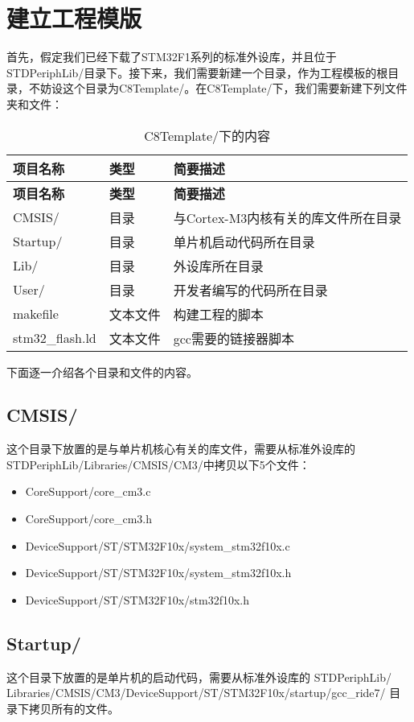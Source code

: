 \section{建立工程模版}
首先，假定我们已经下载了STM32F1系列的标准外设库，并且位于STDPeriphLib/目录下。接下来，我们需要新建一个目录，作为工程模板的根目录，不妨设这个目录为C8Template/。在C8Template/下，我们需要新建下列文件夹和文件：
\begin{center}
	\begin{longtable}[l]{| p{30mm} | p{30mm} | p{80mm} |}
		\caption{C8Template/下的内容}\\
		\hline 
		\rowcolor{Gray}
		\textbf{项目名称} & \textbf{类型} & \textbf{简要描述} \\
		\hline
		\endfirsthead
		
		\hline 
		\rowcolor{Gray}
		\textbf{项目名称} & \textbf{类型} & \textbf{简要描述} \\
		\hline
		\endhead
		
		CMSIS/ &  目录 & 与Cortex-M3内核有关的库文件所在目录 \\ 
		Startup/ & 目录 & 单片机启动代码所在目录 \\
		Lib/ & 目录 & 外设库所在目录 \\
		User/ & 目录 & 开发者编写的代码所在目录 \\
		makefile & 文本文件 & 构建工程的脚本 \\
		stm32\_flash.ld & 文本文件 & gcc需要的链接器脚本 \\
		\hline
	\end{longtable}
\end{center}
\par 
下面逐一介绍各个目录和文件的内容。
\subsection{CMSIS/}
这个目录下放置的是与单片机核心有关的库文件，需要从标准外设库的\\STDPeriphLib/Libraries/CMSIS/CM3/中拷贝以下5个文件：
\begin{itemize}
	\item CoreSupport/core\_cm3.c
	\item CoreSupport/core\_cm3.h
	\item DeviceSupport/ST/STM32F10x/system\_stm32f10x.c
	\item DeviceSupport/ST/STM32F10x/system\_stm32f10x.h
	\item DeviceSupport/ST/STM32F10x/stm32f10x.h
\end{itemize}
\subsection{Startup/}
这个目录下放置的是单片机的启动代码，需要从标准外设库的
STDPeriphLib/\\Libraries/CMSIS/CM3/DeviceSupport/ST/STM32F10x/startup/gcc\_ride7/
目录下拷贝所有的文件。
